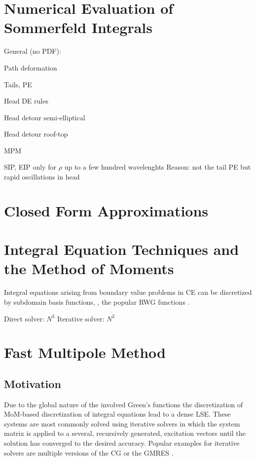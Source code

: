 \section{Numerical Evaluation of Sommerfeld Integrals}

General (no PDF):
\cite{mosig1982}

Path deformation
\cite{Michalski1985a}

Tails, \ac{PE}
\cite{Michalski1998}
\cite{Mosig2012}
\cite{mosig2013}
\cite{Michalski2016a}
\cite{Golubovic2012}

Head DE rules
\cite{golubovicniciforovic2011}

Head detour semi-elliptical
\cite{GayBalmaz1997}

Head detour roof-top
\cite{Michalski2015a}

MPM
\cite{MengtaoYuan2006a}

\ac{SIP}, \ac{EIP} only for $\rho$ up to a few hundred wavelenghts \cite[p.~14]{Michalski2016b}
Reason: not the tail \ac{PE} but rapid oscillations in head

\section{Closed Form Approximations}

\section{Integral Equation Techniques and the Method of Moments}

\cite{Harrington1993}

Integral equations arising from boundary value problems in \ac{CE} can be
discretized by subdomain basis functions, \eg, the popular \ac{RWG} functions
\cite{Rao1982}.

Direct solver: $N^3$
Iterative solver: $N^2$

\section{Fast Multipole Method}

\subsection{Motivation}

Due to the global nature of the involved Green's functions the discretization
of \ac{MoM}-based discretization of integral equations lead to a dense \ac{LSE}.
These systems are most commonly solved using iterative solvers in which the
system matrix is applied to a several, recursively generated, excitation
vectors until the solution has converged to the desired accuracy.
Popular examples for iterative solvers are multiple versions of the \ac{CG}
or the \ac{GMRES} \cite{Strang2010}.

